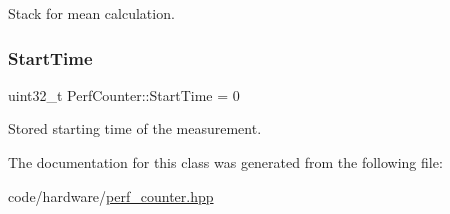 Stack for mean calculation. 

\mbox{\label{classPerfCounter_adefe85b05d9c8920877053f6a8ed743c}} 
\subsubsection{\texorpdfstring{Start\+Time}{StartTime}}
{\footnotesize\ttfamily uint32\+\_\+t Perf\+Counter\+::\+Start\+Time = 0}



Stored starting time of the measurement. 



The documentation for this class was generated from the following file\+:\begin{DoxyCompactItemize}
\item 
code/hardware/\hyperlink{perf__counter_8hpp}{perf\+\_\+counter.\+hpp}\end{DoxyCompactItemize}
